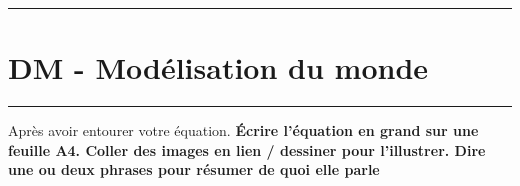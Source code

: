 \documentclass[12pt]{article}
\newcommand{\horrule}[1]{\rule{\linewidth}{#1}} %
\begin{document}

\newtheorem{Definition}{Définition}
\newtheorem{Theorem}{Théorème}
\newtheorem{Proposition}{Propriété}

\renewcommand{\labelitemi}{$\bullet$}
\renewcommand{\labelitemii}{$\circ$}

\setlength{\columnseprule}{1pt}

\horrule{2px}
\section*{DM - Modélisation du monde}
\horrule{2px}

Après avoir entourer votre équation. 
\textbf{Écrire l'équation en grand sur une feuille A4. Coller des images en lien / dessiner pour l'illustrer. Dire une ou deux phrases pour résumer \og de quoi elle parle \fg}
\end{document}
